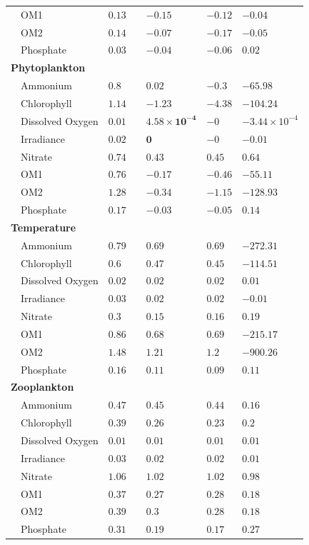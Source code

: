 \documentclass[letterpaper,12pt,oneside]{article}\usepackage[]{graphicx}\usepackage[]{color}
\begin{document}
\begin{table}[!tbp]
{\begin{center}
\begin{tabular}{llclll}
~~OM1&$0.13$&&$-0.15$&$-0.12$&$-0.04$\tabularnewline
~~OM2&$0.14$&&$-0.07$&$-0.17$&$-0.05$\tabularnewline
~~Phosphate&$0.03$&&$-0.04$&$-0.06$&$\bm{0.02}$\tabularnewline
\hline
{\bfseries Phytoplankton}&&&&&\tabularnewline
~~Ammonium&$0.8$&&$\bm{0.02}$&$-0.3$&$-65.98$\tabularnewline
~~Chlorophyll&$1.14$&&$-1.23$&$-4.38$&$-104.24$\tabularnewline
~~Dissolved Oxygen&$0.01$&&$\bm{4.58\times 10^{-4}}$&$-0$&$-3.44\times 10^{-4}$\tabularnewline
~~Irradiance&$0.02$&&$\bm{0}$&$-0$&$-0.01$\tabularnewline
~~Nitrate&$0.74$&&$\bm{0.43}$&$\bm{0.45}$&$\bm{0.64}$\tabularnewline
~~OM1&$0.76$&&$-0.17$&$-0.46$&$-55.11$\tabularnewline
~~OM2&$1.28$&&$-0.34$&$-1.15$&$-128.93$\tabularnewline
~~Phosphate&$0.17$&&$-0.03$&$-0.05$&$\bm{0.14}$\tabularnewline
\hline
{\bfseries Temperature}&&&&&\tabularnewline
~~Ammonium&$0.79$&&$\bm{0.69}$&$\bm{0.69}$&$-272.31$\tabularnewline
~~Chlorophyll&$0.6$&&$\bm{0.47}$&$\bm{0.45}$&$-114.51$\tabularnewline
~~Dissolved Oxygen&$0.02$&&$\bm{0.02}$&$\bm{0.02}$&$\bm{0.01}$\tabularnewline
~~Irradiance&$0.03$&&$\bm{0.02}$&$\bm{0.02}$&$-0.01$\tabularnewline
~~Nitrate&$0.3$&&$\bm{0.15}$&$\bm{0.16}$&$\bm{0.19}$\tabularnewline
~~OM1&$0.86$&&$\bm{0.68}$&$\bm{0.69}$&$-215.17$\tabularnewline
~~OM2&$1.48$&&$\bm{1.21}$&$\bm{1.2}$&$-900.26$\tabularnewline
~~Phosphate&$0.16$&&$\bm{0.11}$&$\bm{0.09}$&$\bm{0.11}$\tabularnewline
\hline
{\bfseries Zooplankton}&&&&&\tabularnewline
~~Ammonium&$0.47$&&$\bm{0.45}$&$\bm{0.44}$&$\bm{0.16}$\tabularnewline
~~Chlorophyll&$0.39$&&$\bm{0.26}$&$\bm{0.23}$&$\bm{0.2}$\tabularnewline
~~Dissolved Oxygen&$0.01$&&$\bm{0.01}$&$\bm{0.01}$&$\bm{0.01}$\tabularnewline
~~Irradiance&$0.03$&&$\bm{0.02}$&$\bm{0.02}$&$\bm{0.01}$\tabularnewline
~~Nitrate&$1.06$&&$\bm{1.02}$&$\bm{1.02}$&$\bm{0.98}$\tabularnewline
~~OM1&$0.37$&&$\bm{0.27}$&$\bm{0.28}$&$\bm{0.18}$\tabularnewline
~~OM2&$0.39$&&$\bm{0.3}$&$\bm{0.28}$&$\bm{0.18}$\tabularnewline
~~Phosphate&$0.31$&&$\bm{0.19}$&$\bm{0.17}$&$\bm{0.27}$\tabularnewline
\hline
\end{tabular}\end{center}}

\end{table}


\clearpage

\end{document}
